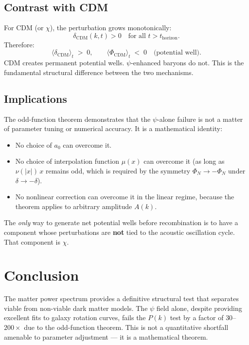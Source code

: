 \documentclass[12pt,a4paper]{article}
\newcommand{\azero}{a_0}
\begin{document}
\subsection{Contrast with CDM}

For CDM (or $\chi$), the perturbation grows monotonically:
\begin{equation}
  \delta_{\mathrm{CDM}}(k,t) > 0 \quad\text{for all } t > t_{\mathrm{horizon}}.
\end{equation}
Therefore:
\begin{equation}
  \langle\delta_{\mathrm{CDM}}\rangle_t \;>\; 0,
  \qquad
  \langle\Phi_{\mathrm{CDM}}\rangle_t \;<\; 0
  \quad\text{(potential well)}.
\end{equation}
CDM creates permanent potential wells. $\psi$-enhanced baryons do not.
This is the fundamental structural difference between the two mechanisms.

\subsection{Implications}

The odd-function theorem demonstrates that the $\psi$-alone failure is
not a matter of parameter tuning or numerical accuracy. It is a
mathematical identity:
\begin{itemize}
  \item No choice of $\azero$ can overcome it.
  \item No choice of interpolation function $\mu(x)$ can overcome it
    (as long as $\nu(|x|)\,x$ remains odd, which is required by the
    symmetry $\Phi_N \to -\Phi_N$ under $\delta \to -\delta$).
  \item No nonlinear correction can overcome it in the linear regime,
    because the theorem applies to arbitrary amplitude $A(k)$.
\end{itemize}

The \emph{only} way to generate net potential wells before recombination
is to have a component whose perturbations are \textbf{not} tied to the
acoustic oscillation cycle. That component is $\chi$.

\section{Conclusion}
\label{sec:conclusion}

The matter power spectrum provides a definitive structural test that
separates viable from non-viable dark matter models. The $\psi$ field
alone, despite providing excellent fits to galaxy rotation curves,
fails the $P(k)$ test by a factor of $30$--$200\times$ due to the
odd-function theorem. This is not a quantitative shortfall amenable to
parameter adjustment --- it is a mathematical theorem.
\end{document}
